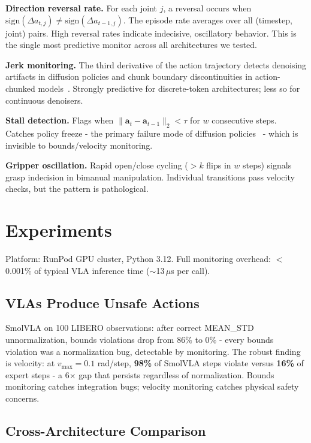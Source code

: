 \documentclass[conference]{IEEEtran}
\begin{document}
\noindent\textbf{Direction reversal rate.}
For each joint $j$, a reversal occurs when $\text{sign}(\Delta a_{t,j}) \neq \text{sign}(\Delta a_{t-1,j})$.
The episode rate averages over all (timestep, joint) pairs.
High reversal rates indicate indecisive, oscillatory behavior.
This is the single most predictive monitor across all architectures we tested.

\noindent\textbf{Jerk monitoring.}
The third derivative of the action trajectory detects denoising artifacts in diffusion policies and chunk boundary discontinuities in action-chunked models~\cite{acg2025}.
Strongly predictive for discrete-token architectures; less so for continuous denoisers.

\noindent\textbf{Stall detection.}
Flags when $\|\mathbf{a}_t - \mathbf{a}_{t-1}\|_2 < \tau$ for $w$ consecutive steps.
Catches policy freeze - the primary failure mode of diffusion policies~\cite{safe2025} - which is invisible to bounds/velocity monitoring.

\noindent\textbf{Gripper oscillation.}
Rapid open/close cycling ($>k$ flips in $w$ steps) signals grasp indecision in bimanual manipulation.
Individual transitions pass velocity checks, but the pattern is pathological.

\section{Experiments}
\label{sec:experiments}

Platform: RunPod GPU cluster, Python 3.12.
Full monitoring overhead: $<$0.001\% of typical VLA inference time (${\sim}$13\,$\mu$s per call).

\subsection{VLAs Produce Unsafe Actions}
\label{sec:exp_unsafe}

SmolVLA on 100 LIBERO observations: after correct MEAN\_STD unnormalization, bounds violations drop from 86\% to 0\% - every bounds violation was a normalization bug, detectable by monitoring.
The robust finding is velocity: at $v_{\max}{=}0.1$ rad/step, \textbf{98\%} of SmolVLA steps violate versus \textbf{16\%} of expert steps - a 6$\times$ gap that persists regardless of normalization.
Bounds monitoring catches integration bugs; velocity monitoring catches physical safety concerns.

\subsection{Cross-Architecture Comparison}
\label{sec:crossarch}
\end{document}
